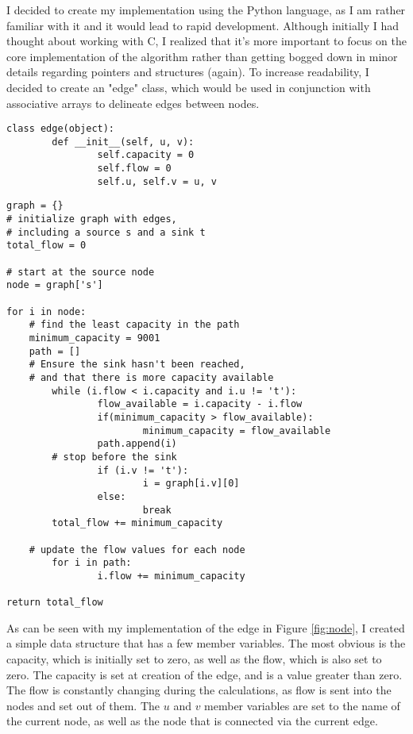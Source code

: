 \documentclass[conference]{IEEEtran}
\begin{document}
I decided to create my implementation using the Python language, as I am rather familiar with it and it would lead to rapid development. Although initially I had thought about working with C, I realized that it's more important to focus on the core implementation of the algorithm rather than getting bogged down in minor details regarding pointers and structures (again). To increase readability, I decided to create an "edge" class, which would be used in conjunction with associative arrays to delineate edges between nodes.

\begin{figure*}[t]
\begin{lstlisting}
class edge(object):
        def __init__(self, u, v):
                self.capacity = 0
                self.flow = 0
                self.u, self.v = u, v
\end{lstlisting}
\caption{Node Class in Python}\label{fig:node}
\end{figure*}

\begin{figure*}[t]
\begin{lstlisting}
graph = {}
# initialize graph with edges,
# including a source s and a sink t
total_flow = 0

# start at the source node
node = graph['s']

for i in node:
	# find the least capacity in the path
	minimum_capacity = 9001
	path = []
	# Ensure the sink hasn't been reached,
	# and that there is more capacity available
        while (i.flow < i.capacity and i.u != 't'):
                flow_available = i.capacity - i.flow
                if(minimum_capacity > flow_available):
                        minimum_capacity = flow_available
                path.append(i)
		# stop before the sink
                if (i.v != 't'):
                        i = graph[i.v][0]
                else:
                        break
        total_flow += minimum_capacity

	# update the flow values for each node
        for i in path:
                i.flow += minimum_capacity

return total_flow
\end{lstlisting}
\caption{Ford Fulkerson Algorithm in Python}\label{fig:algo}
\end{figure*}

As can be seen with my implementation of the edge in Figure \ref{fig:node}, I created a simple data structure that has a few member variables. The most obvious is the capacity, which is initially set to zero, as well as the flow, which is also set to zero. The capacity is set at creation of the edge, and is a value greater than zero. The flow is constantly changing during the calculations, as flow is sent into the nodes and set out of them. The $u$ and $v$ member variables are set to the name of the current node, as well as the node that is connected via the current edge. 
\end{document}
